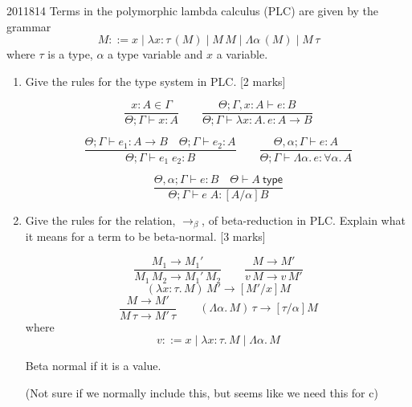 \documentclass[10pt,\jkfside,a4paper]{article}
\newcommand{\answer}[1]{
    \begin{tcolorbox}[colframe=black, colback=white, sharp corners, boxrule=0.2mm, breakable]
        #1
    \end{tcolorbox}
}
\newcommand{\qmarks}[1]{\hspace*{\fill}[#1]}
\begin{document}
\begin{examquestion}{2011}{8}{14}
    Terms in the polymorphic lambda calculus (PLC) are given by the grammar
    \[
        M ::= x \mid \lambda x : \tau\, (M) \mid M\,M \mid \Lambda \alpha\, (M) \mid M\,\tau
    \]
    where $\tau$ is a type, $\alpha$ a type variable and $x$ a variable.

    \begin{enumerate}
        \item
            Give the rules for the type system in PLC. \qmarks{2 marks}

            \answer{
                \[
                    \frac{x : A \in \Gamma}{\Theta; \Gamma \vdash x : A}
                    \qquad
                    \frac{\Theta; \Gamma, x : A \vdash e : B}{\Theta; \Gamma \vdash \lambda x : A.\, e : A \to B}
                \]

                \[
                    \frac{\Theta; \Gamma \vdash e_1 : A \to B \quad \Theta; \Gamma \vdash e_2 : A}{\Theta; \Gamma \vdash e_1\;e_2 : B}
                    \qquad
                    \frac{\Theta, \alpha; \Gamma \vdash e : A}{\Theta; \Gamma \vdash \Lambda \alpha.\, e : \forall \alpha.\, A}
                \]

                \[
                    \frac{\Theta, \alpha; \Gamma \vdash e : B \quad \Theta \vdash A\ \mathsf{type}}{\Theta; \Gamma \vdash e\;A : [A/\alpha]B}
                \]
            }

        \item
            Give the rules for the relation, $\to_\beta$, of beta-reduction in PLC.
            Explain what it means for a term to be beta-normal. \qmarks{3 marks}

            \answer{
                \[
                    \frac{M_1 \to M_1'}{M_1\,M_2 \to M_1'\,M_2}
                    \qquad
                    \frac{M \to M'}{v\,M \to v\,M'}
                \]
                \[
                    (\lambda x : \tau.\, M)\,M' \to [M'/x]M
                \]
                \[
                    \frac{M \to M'}{M\,\tau \to M'\,\tau}
                    \qquad
                    (\Lambda \alpha.\, M)\,\tau \to [\tau/\alpha]M
                \]
                where
                \[
                    v ::= x \mid \lambda x : \tau.\, M \mid \Lambda \alpha.\, M
                \]

                Beta normal if it is a value. 

                (Not sure if we normally include this, but seems like we need this for c)

}
\end{enumerate}
\end{examquestion}
\end{document}
